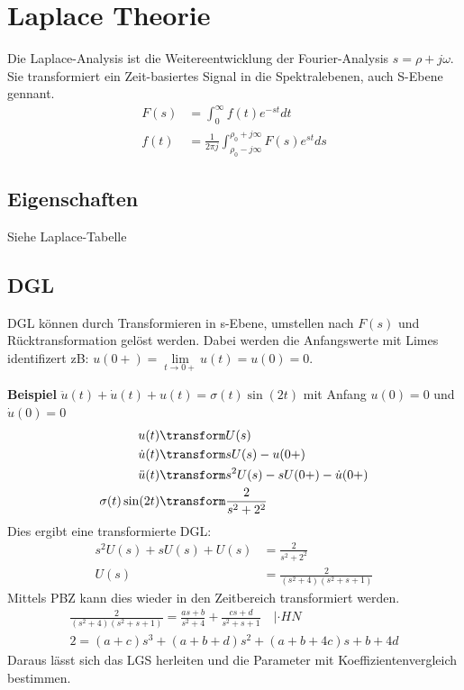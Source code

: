 \section{Laplace Theorie}
Die Laplace-Analysis ist die Weitereentwicklung der Fourier-Analysis $s = \rho + j\omega$. Sie transformiert ein Zeit-basiertes Signal in die Spektralebenen, auch S-Ebene gennant.
\begin{align*}
	F(s) &= \int_{0}^{\infty}f(t)e^{-st}dt \\
	f(t) &= \frac{1}{2\pi j}\int_{\rho_0 - j\infty}^{\rho_0 + j \infty}F(s)e^{st}ds
\end{align*}

\subsection{Eigenschaften}
Siehe Laplace-Tabelle

\subsection{DGL}
DGL können durch Transformieren in s-Ebene, umstellen nach $F(s)$ und Rücktransformation gelöst werden. Dabei werden die Anfangswerte mit Limes identifizert zB: $u(0+) = \lim\limits_{t\rightarrow0+}u(t) = u(0) = 0$.


\noindent\textbf{Beispiel} $\ddot{u}(t) + \dot{u}(t) + u(t) = \sigma(t)\sin(2t)$ mit Anfang $u(0) = 0$ und $\dot{u}(0) = 0$
\begin{align*}
	u(t) &\transform U(s) \\
	\dot{u}(t) &\transform sU(s) - u(0+) \\
	\ddot{u}(t) &\transform s^2U(s) - sU(0+) - \dot{u}(0+) \\
	\sigma(t)\sin(2t) &\transform \frac{2}{s^2 + 2^2}
\end{align*}
Dies ergibt eine transformierte DGL:
\begin{align*}
	s^2U(s) + sU(s) + U(s) &= \frac{2}{s^2 + 2^2} \\
	U(s) &= \frac{2}{(s^2 + 4)(s^2 + s + 1)}
\end{align*}
Mittels PBZ kann dies wieder in den Zeitbereich transformiert werden.
\begin{align*}
	\frac{2}{(s^2 + 4)(s^2 + s + 1)} = \frac{as +b}{s^2 + 4}+\frac{cs + d}{s^2 + s + 1} \quad | \cdot HN \\
	2 = (a + c)s^3 + (a+b+d)s^2 + (a+b+4c)s + b + 4d
\end{align*}
Daraus lässt sich das LGS herleiten und die Parameter mit Koeffizientenvergleich bestimmen.


